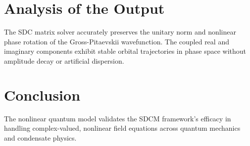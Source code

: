 \section{Analysis of the Output}
The SDC matrix solver accurately preserves the unitary norm and nonlinear phase rotation of the Gross-Pitaevskii wavefunction. The coupled real and imaginary components exhibit stable orbital trajectories in phase space without amplitude decay or artificial dispersion.

\section{Conclusion}
The nonlinear quantum model validates the SDCM framework's efficacy in handling complex-valued, nonlinear field equations across quantum mechanics and condensate physics.